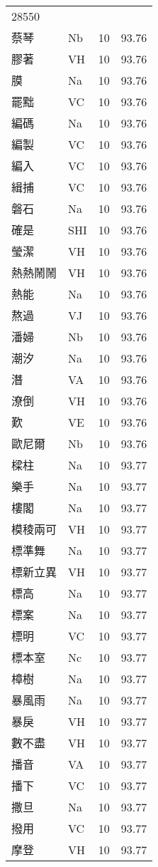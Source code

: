 \documentclass[twocolumn]{book}
\begin{document}
\begin{supertabular}{llrr}
28550\\
蔡琴 & Nb & 10 &  93.76\\
膠著 & VH & 10 &  93.76\\
膜 & Na & 10 &  93.76\\
罷黜 & VC & 10 &  93.76\\
編碼 & Na & 10 &  93.76\\
編製 & VC & 10 &  93.76\\
編入 & VC & 10 &  93.76\\
緝捕 & VC & 10 &  93.76\\
磐石 & Na & 10 &  93.76\\
確是 & SHI & 10 &  93.76\\
瑩潔 & VH & 10 &  93.76\\
熱熱鬧鬧 & VH & 10 &  93.76\\
熱能 & Na & 10 &  93.76\\
熬過 & VJ & 10 &  93.76\\
潘婦 & Nb & 10 &  93.76\\
潮汐 & Na & 10 &  93.76\\
潛 & VA & 10 &  93.76\\
潦倒 & VH & 10 &  93.76\\
歎 & VE & 10 &  93.76\\
歐尼爾 & Nb & 10 &  93.76\\
樑柱 & Na & 10 &  93.77\\
樂手 & Na & 10 &  93.77\\
樓閣 & Na & 10 &  93.77\\
模稜兩可 & VH & 10 &  93.77\\
標準舞 & Na & 10 &  93.77\\
標新立異 & VH & 10 &  93.77\\
標高 & Na & 10 &  93.77\\
標案 & Na & 10 &  93.77\\
標明 & VC & 10 &  93.77\\
標本室 & Nc & 10 &  93.77\\
樟樹 & Na & 10 &  93.77\\
暴風雨 & Na & 10 &  93.77\\
暴戾 & VH & 10 &  93.77\\
數不盡 & VH & 10 &  93.77\\
播音 & VA & 10 &  93.77\\
播下 & VC & 10 &  93.77\\
撒旦 & Na & 10 &  93.77\\
撥用 & VC & 10 &  93.77\\
摩登 & VH & 10 &  93.77\\

\end{supertabular}
\end{document}
